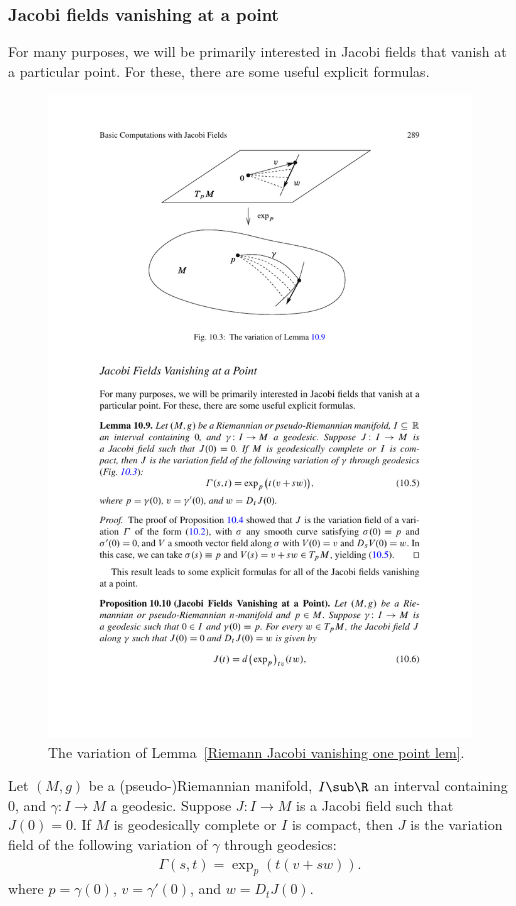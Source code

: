 \subsubsection{Jacobi fields vanishing at a point}
For many purposes, we will be primarily interested in Jacobi fields that vanish at a particular point. For these, there are some useful explicit formulas.
\begin{figure}[htbp]
\centering
\includegraphics{pictures/Jacobi-field-one-point}
\caption{The variation of Lemma~\ref{Riemann Jacobi vanishing one point lem}.}
\end{figure}
\begin{lemma}\label{Riemann Jacobi vanishing one point lem}
Let $(M,g)$ be a (pseudo-)Riemannian manifold, $I\sub\R$ an interval containing $0$, and $\gamma:I\to M$ a geodesic. Suppose $J:I\to M$ is a Jacobi field 
such that $J(0)=0$. If $M$ is geodesically complete or $I$ is compact, then $J$ is the variation field of the following variation of $\gamma$ through geodesics:
\begin{align}\label{Riemann Jacobi vanishing one point variation field}
\Gamma(s,t)=\exp_p(t(v+sw)).
\end{align}
where $p=\gamma(0)$, $v=\gamma'(0)$, and $w=D_tJ(0)$.
\end{lemma}
